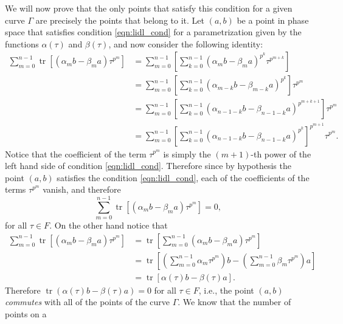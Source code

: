 \documentclass[a4paper]{article}
\DeclareMathOperator{\tr}{tr}
\begin{document}
  We will now prove that the only points that satisfy this
  condition for a given curve $\Gamma$ are precisely the
  points that belong to it. Let $(a,b)$ be a point in phase
  space that satisfies condition \eqref{eqn:lidl_cond} for a
  parametrization given by the functions $\alpha(\tau)$ and
  $\beta(\tau)$, and now consider the following identity:
  \begin{align}
    \sum_{m=0}^{n-1}  
    \tr\left[
      (\alpha_m b - \beta_m a) \tau^{p^{m}}
    \right]
    &= \sum_{m=0}^{n-1} 
    \left[
      \sum_{k=0}^{n-1} 
      (\alpha_m b - \beta_m a)^{p^{k}}
      \tau^{p^{m+k}}
    \right] \\
    &= \sum_{m=0}^{n-1} \left[
    \sum_{k=0}^{n-1} \left( 
      \alpha_{m-k} b - \beta_{m-k} a
    \right)^{p^{k}} \right] \tau^{p^{m}} \\
    &= \sum_{m=0}^{n-1} \left[
    \sum_{k=0}^{n-1}
    (\alpha_{n-1-k} b - \beta_{n-1-k} a)^{p^{m+k+1}}
    \right] \tau^{p^{m}} \\
    &= \sum_{m=0}^{n-1} \left[
    \sum_{k=0}^{n-1}
    (\alpha_{n-1-k} b - \beta_{n-1-k} a)^{p^{k}}
    \right]^{p^{m+1}} \tau^{p^{m}}.
  \end{align}
  Notice that the coefficient of the term $\tau^{p^{m}}$ is
  simply the $(m+1)$-th power of the left hand side of
  condition \eqref{eqn:lidl_cond}. Therefore since by
  hypothesis the point $(a,b)$ satisfies the condition
  \eqref{eqn:lidl_cond}, each of the coefficients of the
  terms $\tau^{p^{m}}$ vanish, and therefore
  \begin{equation}
    \sum_{m=0}^{n-1} 
    \tr\left[
      (\alpha_m b - \beta_m a) \tau^{p^{m}}
    \right] = 0,
  \end{equation}
  for all $\tau \in F$. On the other hand notice that
  \begin{align}
    \sum_{m=0}^{n-1} 
    \tr\left[
      (\alpha_m b - \beta_m a) \tau^{p^{m}}
    \right]
    &= \tr\left[
      \sum_{m=0}^{n-1} 
      (\alpha_m b - \beta_m a) \tau^{p^{m}}
    \right] \\
    &= \tr\left[
      \left(\sum_{m=0}^{n-1} 
      \alpha_m \tau^{p^{m}}\right) b
      - \left(\sum_{m=0}^{n-1} 
      \beta_m \tau^{p^{m}}\right) a
    \right] \\
    &= \tr\left[\alpha(\tau) b - \beta(\tau) a\right].
  \end{align}
  Therefore $\tr\left( \alpha(\tau) b - \beta(\tau) a
  \right) = 0$ for all $\tau \in F$, i.e., the point $(a,b)$
  \textit{commutes} with all of the points of the curve
  $\Gamma$. We know that the number of points on a
\end{document}

